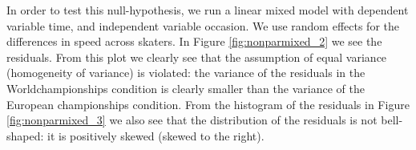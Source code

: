 In order to test this null-hypothesis, we run a linear mixed model with dependent variable time, and independent variable occasion. We use random effects for the differences in speed across skaters. In Figure \ref{fig:nonparmixed_2} we see the residuals. From this plot we clearly see that the assumption of equal variance (homogeneity of variance) is violated: the variance of the residuals in the Worldchampionships condition is clearly smaller than the variance of the European championships condition. From the histogram of the residuals in Figure \ref{fig:nonparmixed_3} we also see that the distribution of the residuals is not bell-shaped: it is positively skewed (skewed to the right).

\begin{knitrout}
\color{fgcolor}\begin{kframe}


{\ttfamily\noindent\bfseries{}}

{\ttfamily\noindent\bfseries\color{errorcolor}{\#\# Error in cbind(datalong, res): object 'datalong' not found}}

{\ttfamily\noindent\bfseries{}}\end{kframe}
\end{knitrout}






